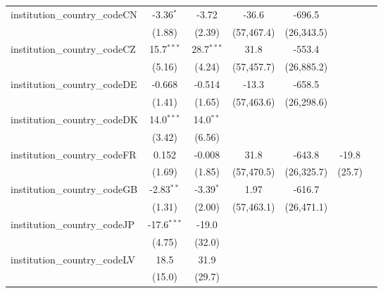 \begin{tabular}{lcccccc}
   institution\_country\_codeCN          & -3.36$^{*}$   & -3.72         & -36.6        & -696.5     &           &   \\   
                                         & (1.88)        & (2.39)        & (57,467.4)   & (26,343.5) &           &   \\   
   institution\_country\_codeCZ          & 15.7$^{***}$  & 28.7$^{***}$  & 31.8         & -553.4     &           &   \\   
                                         & (5.16)        & (4.24)        & (57,457.7)   & (26,885.2) &           &   \\   
   institution\_country\_codeDE          & -0.668        & -0.514        & -13.3        & -658.5     &           &   \\   
                                         & (1.41)        & (1.65)        & (57,463.6)   & (26,298.6) &           &   \\   
   institution\_country\_codeDK          & 14.0$^{***}$  & 14.0$^{**}$   &              &            &           &   \\   
                                         & (3.42)        & (6.56)        &              &            &           &   \\   
   institution\_country\_codeFR          & 0.152         & -0.008        & 31.8         & -643.8     & -19.8     &   \\   
                                         & (1.69)        & (1.85)        & (57,470.5)   & (26,325.7) & (25.7)    &   \\   
   institution\_country\_codeGB          & -2.83$^{**}$  & -3.39$^{*}$   & 1.97         & -616.7     &           &   \\   
                                         & (1.31)        & (2.00)        & (57,463.1)   & (26,471.1) &           &   \\   
   institution\_country\_codeJP          & -17.6$^{***}$ & -19.0         &              &            &           &   \\   
                                         & (4.75)        & (32.0)        &              &            &           &   \\   
   institution\_country\_codeLV          & 18.5          & 31.9          &              &            &           &   \\   
                                         & (15.0)        & (29.7)        &              &            &           &   \\   

\end{tabular}

